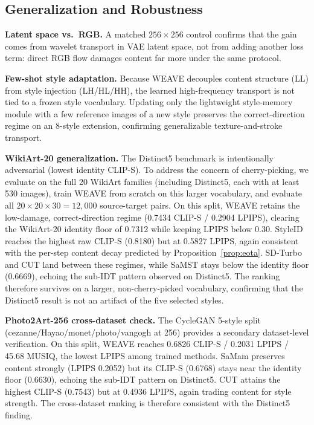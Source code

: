 \documentclass[letterpaper]{article}
\begin{document}
\subsection{Generalization and Robustness}
\label{sec:gen}

\textbf{Latent space vs.\ RGB.}
A matched $256{\times}256$ control confirms that the gain comes from wavelet transport in VAE latent space, not from adding another loss term: direct RGB flow damages content far more under the same protocol.

\textbf{Few-shot style adaptation.}
Because WEAVE decouples content structure (LL) from style injection (LH/HL/HH), the learned high-frequency transport is not tied to a frozen style vocabulary.
Updating only the lightweight style-memory module with a few reference images of a new style preserves the correct-direction regime on an 8-style extension, confirming generalizable texture-and-stroke transport.

\textbf{WikiArt-20 generalization.}
The Distinct5 benchmark is intentionally adversarial (lowest identity CLIP-S).
To address the concern of cherry-picking, we evaluate on the full 20 WikiArt families (including Distinct5, each with at least 530 images), train WEAVE from scratch on this larger vocabulary, and evaluate all $20{\times}20{\times}30{=}12{,}000$ source-target pairs.
On this split, WEAVE retains the low-damage, correct-direction regime (0.7434 CLIP-S / 0.2904 LPIPS), clearing the WikiArt-20 identity floor of 0.7312 while keeping LPIPS below 0.30.
StyleID reaches the highest raw CLIP-S (0.8180) but at 0.5827 LPIPS, again consistent with the per-step content decay predicted by Proposition~\ref{prop:eota}.
SD-Turbo and CUT land between these regimes, while SaMST stays below the identity floor (0.6669), echoing the sub-IDT pattern observed on Distinct5.
The ranking therefore survives on a larger, non-cherry-picked vocabulary, confirming that the Distinct5 result is not an artifact of the five selected styles.

\textbf{Photo2Art-256 cross-dataset check.}
The CycleGAN 5-style split (cezanne/Hayao/monet/photo/vangogh at 256) provides a secondary dataset-level verification.
On this split, WEAVE reaches 0.6826 CLIP-S / 0.2031 LPIPS / 45.68 MUSIQ, the lowest LPIPS among trained methods.
SaMam preserves content strongly (LPIPS 0.2052) but its CLIP-S (0.6768) stays near the identity floor (0.6630), echoing the sub-IDT pattern on Distinct5.
CUT attains the highest CLIP-S (0.7543) but at 0.4936 LPIPS, again trading content for style strength.
The cross-dataset ranking is therefore consistent with the Distinct5 finding.
\end{document}
